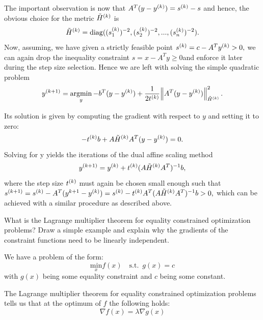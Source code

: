 \documentclass[12pt,a4paper]{article}
\begin{document}
The important observation is now that $A^T (y-\kth{y}) = \kth{s}-s$ and hence, the obvious choice for the metric $\kth{\tilde{H}}$ is
\begin{equation*}
    \kth{\tilde{H}}=\diag((\kth{s_1})^{-2},(\kth{s_2})^{-2},...,(\kth{s_n})^{-2}).
\end{equation*}
Now, assuming, we have given a strictly feasible point $\kth{s} = c -A^T \kth{y} > 0,$ we can again drop the inequality constraint $s = x -A^T y \geq 0 $and enforce it later during the step size selection.
Hence we are left with solving the simple quadratic problem
\begin{equation*}
    \kth[k+1]{y}=\argmin_y -b^T(y-\kth{y}) + \frac{1}{2\kth{t}}\norm{A^T(y-\kth{y})}_{\kth{\tilde{H}}}^2.
\end{equation*}

Its solution is given by computing the gradient with respect to $y$ and setting it to zero:
\begin{equation*}
    -\kth{t}b + A\kth{\tilde{H}}A^T(y-\kth{y}) = 0.
\end{equation*}
Solving for y yields the iterations of the dual affine scaling method
\begin{equation*}
    \kth[k+1]{y} = \kth{y} + \kth{t}(A\kth{\tilde{H}} A^T)^{-1}b,
\end{equation*}
where the step size $\kth{t}$ must again be chosen small enough such that $\kth[k+1]{s} = \kth{s} - A^T (y^{k+1} - \kth{y}) = \kth{s} - \kth{t} A^T (A \kth{\tilde{H}} A^T)^{-1}b > 0, $ which can be achieved with a similar procedure as described above.

\begin{question}
What is the Lagrange multiplier theorem for equality constrained optimization problems? Draw a simple example and explain why the gradients of the constraint functions need to be linearly independent.
\end{question}


We have a problem of the form:
\begin{equation*}
    \underset{x}{\text{min}} f(x) \quad \text{s.t.} \enspace g(x) = c
\end{equation*}
with $g(x)$ being some equality constraint and $c$ being some constant.

The Lagrange multiplier theorem for equality constrained optimization problems tells us that at the optimum of $f$ the following holds:
\begin{equation*}
    \nabla f(x)=\lambda \nabla g(x)
\end{equation*}
\end{document}
